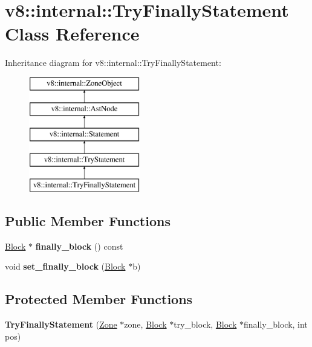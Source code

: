 \hypertarget{classv8_1_1internal_1_1_try_finally_statement}{}\section{v8\+:\+:internal\+:\+:Try\+Finally\+Statement Class Reference}
\label{classv8_1_1internal_1_1_try_finally_statement}
Inheritance diagram for v8\+:\+:internal\+:\+:Try\+Finally\+Statement\+:\begin{figure}[H]
\begin{center}
\leavevmode
\includegraphics[height=5.000000cm]{classv8_1_1internal_1_1_try_finally_statement}
\end{center}
\end{figure}
\subsection*{Public Member Functions}
\begin{DoxyCompactItemize}
\item 
\hyperlink{classv8_1_1internal_1_1_block}{Block} $\ast$ {\bfseries finally\+\_\+block} () const \hypertarget{classv8_1_1internal_1_1_try_finally_statement_a0adef694d20a7cbfdf4f678153a84ad4}{}\label{classv8_1_1internal_1_1_try_finally_statement_a0adef694d20a7cbfdf4f678153a84ad4}

\item 
void {\bfseries set\+\_\+finally\+\_\+block} (\hyperlink{classv8_1_1internal_1_1_block}{Block} $\ast$b)\hypertarget{classv8_1_1internal_1_1_try_finally_statement_af82e701389c0de379fd650128ad3f160}{}\label{classv8_1_1internal_1_1_try_finally_statement_af82e701389c0de379fd650128ad3f160}

\end{DoxyCompactItemize}
\subsection*{Protected Member Functions}
\begin{DoxyCompactItemize}
\item 
{\bfseries Try\+Finally\+Statement} (\hyperlink{classv8_1_1internal_1_1_zone}{Zone} $\ast$zone, \hyperlink{classv8_1_1internal_1_1_block}{Block} $\ast$try\+\_\+block, \hyperlink{classv8_1_1internal_1_1_block}{Block} $\ast$finally\+\_\+block, int pos)\hypertarget{classv8_1_1internal_1_1_try_finally_statement_a2409ff0d7a80ce74fe093790fb557f4b}{}\label{classv8_1_1internal_1_1_try_finally_statement_a2409ff0d7a80ce74fe093790fb557f4b}

\end{DoxyCompactItemize}
